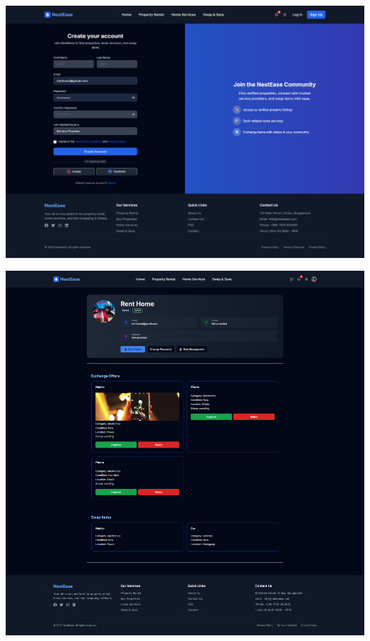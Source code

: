 \documentclass[conference]{IEEEtran}
\begin{document}
\begin{center}
\noindent
\begin{minipage}[t]{0.45\textwidth}
\includegraphics[width=\linewidth]{Project Screenshot/Sign up.png}
\end{minipage} \hfill
\begin{minipage}[t]{0.45\textwidth}
\includegraphics[width=\linewidth]{Project Screenshot/Profile.png}
\end{minipage}


\end{center}
\end{document}
